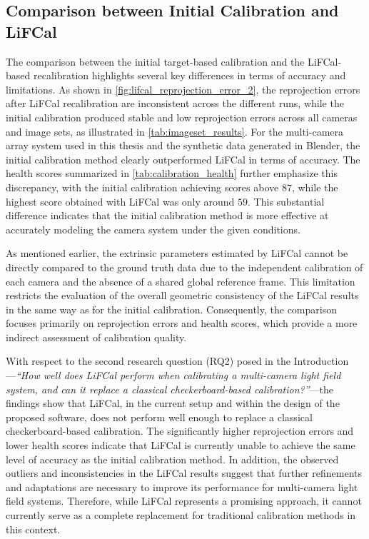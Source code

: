 \documentclass[12pt]{scrartcl}
\begin{document}
\subsection{Comparison between Initial Calibration and LiFCal}

The comparison between the initial target-based calibration and the LiFCal-based recalibration highlights several key differences in terms of accuracy and limitations. As shown in \autoref{fig:lifcal_reprojection_error_2}, the reprojection errors after LiFCal recalibration are inconsistent across the different runs, while the initial calibration produced stable and low reprojection errors across all cameras and image sets, as illustrated in \autoref{tab:imageset_results}. For the multi-camera array system used in this thesis and the synthetic data generated in Blender, the initial calibration method clearly outperformed LiFCal in terms of accuracy. The health scores summarized in \autoref{tab:calibration_health} further emphasize this discrepancy, with the initial calibration achieving scores above $87$, while the highest score obtained with LiFCal was only around $59$. This substantial difference indicates that the initial calibration method is more effective at accurately modeling the camera system under the given conditions.
\newline

As mentioned earlier, the extrinsic parameters estimated by LiFCal cannot be directly compared to the ground truth data due to the independent calibration of each camera and the absence of a shared global reference frame. This limitation restricts the evaluation of the overall geometric consistency of the LiFCal results in the same way as for the initial calibration. Consequently, the comparison focuses primarily on reprojection errors and health scores, which provide a more indirect assessment of calibration quality.
\newline

With respect to the second research question (RQ2) posed in the Introduction—\textit{``How well does LiFCal perform when calibrating a multi-camera light field system, and can it replace a classical checkerboard-based calibration?''}—the findings show that LiFCal, in the current setup and within the design of the proposed software, does not perform well enough to replace a classical checkerboard-based calibration. The significantly higher reprojection errors and lower health scores indicate that LiFCal is currently unable to achieve the same level of accuracy as the initial calibration method. In addition, the observed outliers and inconsistencies in the LiFCal results suggest that further refinements and adaptations are necessary to improve its performance for multi-camera light field systems. Therefore, while LiFCal represents a promising approach, it cannot currently serve as a complete replacement for traditional calibration methods in this context.
\end{document}
